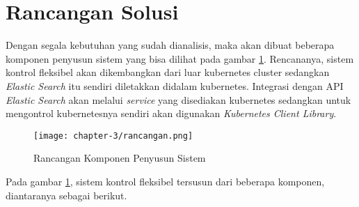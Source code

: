 \section{Rancangan Solusi}
\label{sec:rancangan-solusi}

Dengan segala kebutuhan yang sudah dianalisis, maka akan dibuat beberapa komponen penyusun sistem yang bisa dilihat pada gambar \ref{fig:rancangan-sistem}. Rencananya, sistem kontrol fleksibel akan dikembangkan dari luar kubernetes cluster sedangkan \textit{Elastic Search} itu sendiri diletakkan didalam kubernetes. Integrasi dengan API \textit{Elastic Search} akan melalui \textit{service} yang disediakan kubernetes sedangkan untuk mengontrol kubernetesnya sendiri akan digunakan \textit{Kubernetes Client Library}.

\begin{figure}[h]
    \centering
    \texttt{[image: chapter-3/rancangan.png]}
    \caption{Rancangan Komponen Penyusun Sistem}
    \label{fig:rancangan-sistem}
\end{figure}

Pada gambar \ref{fig:rancangan-sistem}, sistem kontrol fleksibel tersusun dari beberapa komponen, diantaranya sebagai berikut.

